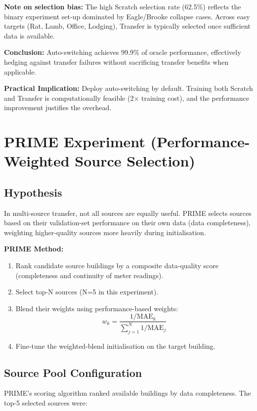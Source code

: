 \documentclass[12pt,a4paper]{report}
\begin{document}
\textbf{Note on selection bias:} The high Scratch selection rate (62.5\%) reflects the binary experiment set-up dominated by Eagle/Brooke collapse cases. Across easy targets (Rat, Lamb, Office, Lodging), Transfer is typically selected once sufficient data is available.

\textbf{Conclusion:} Auto-switching achieves 99.9\% of oracle performance, effectively hedging against transfer failures without sacrificing transfer benefits when applicable.

\textbf{Practical Implication:} Deploy auto-switching by default. Training both Scratch and Transfer is computationally feasible (2$\times$ training cost), and the performance improvement justifies the overhead.

\section{PRIME Experiment (Performance-Weighted Source Selection)}

\subsection{Hypothesis}

In multi-source transfer, not all sources are equally useful. PRIME selects sources based on their validation-set performance on their own data (data completeness), weighting higher-quality sources more heavily during initialisation.

\textbf{PRIME Method:}
\begin{enumerate}
    \item Rank candidate source buildings by a composite data-quality score (completeness and continuity of meter readings).
    \item Select top-N sources (N=5 in this experiment).
    \item Blend their weights using performance-based weights:
    \[
    w_k = \frac{1 / \text{MAE}_k}{\sum_{j=1}^{N} 1 / \text{MAE}_j}
    \]
    \item Fine-tune the weighted-blend initialisation on the target building.
\end{enumerate}

\subsection{Source Pool Configuration}

PRIME's scoring algorithm ranked available buildings by data completeness. The top-5 selected sources were:
\end{document}
